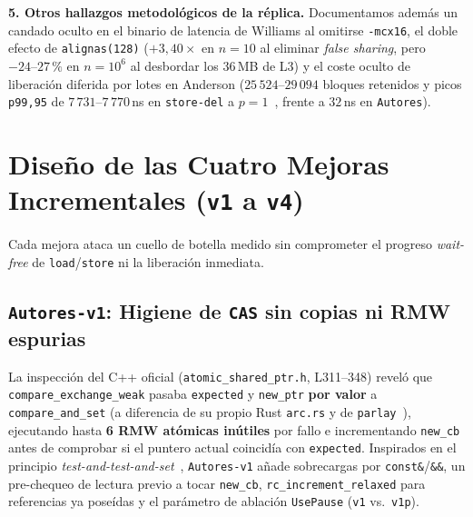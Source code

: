 \documentclass[10pt,twocolumn,a4paper]{article}
\begin{document}
\textbf{5. Otros hallazgos metodológicos de la réplica.} Documentamos además un candado oculto en el binario de latencia de Williams al omitirse \texttt{-mcx16}, el doble efecto de \texttt{alignas(128)} ($+3{,}40\times$ en $n=10$ al eliminar \emph{false sharing}, pero $-24\text{--}27\,\%$ en $n=10^6$ al desbordar los 36\,MB de L3) y el coste oculto de liberación diferida por lotes en Anderson ($25\,524\text{--}29\,094$ bloques retenidos y picos \texttt{p99,95} de $7\,731\text{--}7\,770$\,ns en \texttt{store-del} a $p=1$~\cite{kim2024epochs}, frente a $32$\,ns en \texttt{Autores}).

\section{Diseño de las Cuatro Mejoras Incrementales (\texttt{v1} a \texttt{v4})}

Cada mejora ataca un cuello de botella medido sin comprometer el progreso \emph{wait-free} de \texttt{load}/\texttt{store} ni la liberación inmediata.

\subsection{\texttt{Autores-v1}: Higiene de \texttt{CAS} sin copias ni RMW espurias}
La inspección del C++ oficial (\texttt{atomic\_shared\_ptr.h}, L311--348) reveló que \texttt{compare\_exchange\_weak} pasaba \texttt{expected} y \texttt{new\_ptr} \textbf{por valor} a \texttt{compare\_and\_set} (a diferencia de su propio Rust \texttt{arc.rs} y de \texttt{parlay}~\cite{anderson2022turning}), ejecutando hasta \textbf{6 RMW atómicas inútiles} por fallo e incrementando \texttt{new\_cb} antes de comprobar si el puntero actual coincidía con \texttt{expected}. Inspirados en el principio \emph{test-and-test-and-set}~\cite{mellorcrummey1991mcs}, \texttt{Autores-v1} añade sobrecargas por \texttt{const\&}/\texttt{\&\&}, un pre-chequeo de lectura previo a tocar \texttt{new\_cb}, \texttt{rc\_increment\_relaxed} para referencias ya poseídas y el parámetro de ablación \texttt{UsePause} (\texttt{v1} vs.\ \texttt{v1p}).
\end{document}
